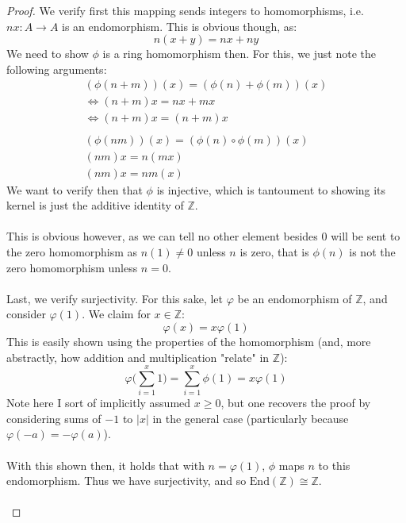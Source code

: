 \documentclass[12pt]{article}
\newenvironment{ex}[2][Exercise]{\begin{trivlist}
\item[\hskip \labelsep {\bfseries #1}\hskip \labelsep {\bfseries #2.}]}{\end{trivlist}}
\begin{document}
\begin{ex}{3}
\begin{enumerate}[label=(\alph*)]
\begin{proof}
        We verify first this mapping sends integers to homomorphisms, i.e. $nx : A \rightarrow A$ is an endomorphism. This is obvious though, as:
        $$n(x + y) = nx + ny$$
        We need to show $\phi$ is a ring homomorphism then. For this, we just note the following arguments:
        \begin{equation}
            \begin{aligned}
            (\phi( n + m))(x) = (\phi(n) + \phi(m))(x) \\
            \Leftrightarrow (n + m)x = nx + mx \\
            \Leftrightarrow (n + m)x = (n + m)x \\ \\
            (\phi(nm))(x) = (\phi(n) \circ \phi(m))(x) \\
            (nm)x = n(mx) \\
            (nm)x = nm(x)
            \end{aligned}
        \end{equation}
        We want to verify then that $\phi$ is injective, which is tantoument to showing its kernel is just the additive identity of $\mathbb{Z}$. \\ \\
        This is obvious however, as we can tell no other element besides $0$ will be sent to the zero homomorphism as $n(1) \neq 0$ unless $n$ is zero, that is $\phi(n)$ is not the zero homomorphism unless $n = 0$. \\ \\
        Last, we verify surjectivity. For this sake, let $\varphi$ be an endomorphism of $\mathbb{Z}$, and consider $\varphi(1)$. We claim for $x \in \mathbb{Z}$:
        $$\varphi(x) = x\varphi(1)$$
        This is easily shown using the properties of the homomorphism (and, more abstractly, how addition and multiplication "relate" in $\mathbb{Z}$):
        \begin{equation}
            \varphi \Big ( \sum_{i = 1}^x 1 \Big ) = \sum_{i = 1}^x \phi(1) = x\varphi(1)
        \end{equation}
        Note here I sort of implicitly assumed $x \geq 0$, but one recovers the proof by considering sums of $-1$ to $|x|$ in the general case (particularly because $\varphi(-a) = -\varphi(a)$). \\ \\
        With this shown then, it holds that with $n = \varphi(1)$, $\phi$ maps $n$ to this endomorphism. Thus we have surjectivity, and so $\text{End}(\mathbb{Z}) \cong \mathbb{Z}$. \\ \\

\end{proof}
\end{enumerate}
\end{ex}
\end{document}
